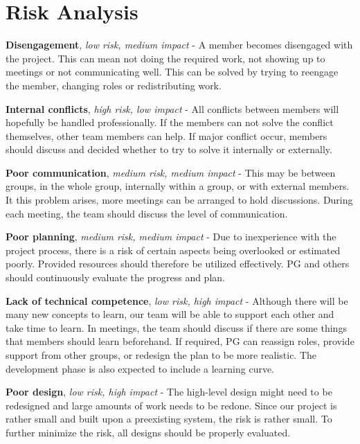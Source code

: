 \documentclass{article}
\begin{document}
\section{Risk Analysis}

\textbf{Disengagement}, \textit{low risk, medium impact} - A member becomes disengaged with the project. This can mean not doing the required work, not showing up to meetings or not communicating well. This can be solved by trying to reengage the member, changing roles or redistributing work. 

\textbf{Internal conflicts}, \textit{high risk, low impact} - All conflicts between members will hopefully be handled professionally. If the members can not solve the conflict themselves, other team members can help. If major conflict occur, members should discuss and decided whether to try to solve it internally or externally. 

\textbf{Poor communication}, \textit{medium risk, medium impact} - This may be between groups, in the whole group, internally within a group, or with external members. It this problem arises, more meetings can be arranged to hold discussions. During each meeting, the team should discuss the level of communication. 

\textbf{Poor planning}, \textit{medium risk, medium impact} - Due to inexperience with the project process, there is a risk of certain aspects being overlooked or estimated poorly. Provided resources should therefore be utilized effectively. PG and others should continuously evaluate the progress and plan. 

\textbf{Lack of technical competence}, \textit{low risk, high impact} - Although there will be many new concepts to learn, our team will be able to support each other and take time to learn. In meetings, the team should discuss if there are some things that members should learn beforehand. If required, PG can reassign roles, provide support from other groups, or redesign the plan to be more realistic. The development phase is also expected to include a learning curve. 

\textbf{Poor design}, \textit{low risk, high impact} - The high-level design might need to be redesigned and large amounts of work needs to be redone. Since our project is rather small and built upon a preexisting system, the risk is rather small. To further minimize the risk, all designs should be properly evaluated.
\end{document}
